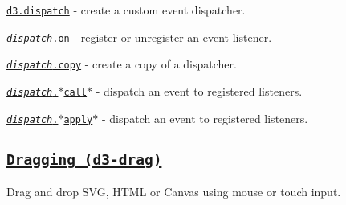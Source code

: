 \begin{DoxyItemize}
\item \href{https://github.com/d3/d3-dispatch/blob/master/README.md#dispatch}{\tt d3.\+dispatch} -\/ create a custom event dispatcher.
\item \href{https://github.com/d3/d3-dispatch/blob/master/README.md#dispatch_on}{\tt {\itshape dispatch}.on} -\/ register or unregister an event listener.
\item \href{https://github.com/d3/d3-dispatch/blob/master/README.md#dispatch_copy}{\tt {\itshape dispatch}.copy} -\/ create a copy of a dispatcher.
\item \href{https://github.com/d3/d3-dispatch/blob/master/README.md#dispatch_call}{\tt {\itshape dispatch}.$\ast$call$\ast$} -\/ dispatch an event to registered listeners.
\item \href{https://github.com/d3/d3-dispatch/blob/master/README.md#dispatch_apply}{\tt {\itshape dispatch}.$\ast$apply$\ast$} -\/ dispatch an event to registered listeners.
\end{DoxyItemize}

\subsection*{\href{https://github.com/d3/d3-drag}{\tt Dragging (d3-\/drag)}}

Drag and drop S\+VG, H\+T\+ML or Canvas using mouse or touch input.


